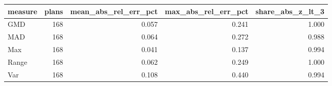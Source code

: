 \begin{tabular}{lrrrr}
\toprule
measure & plans & mean_abs_rel_err_pct & max_abs_rel_err_pct & share_abs_z_lt_3 \\
\midrule
GMD & 168 & 0.057 & 0.241 & 1.000 \\
MAD & 168 & 0.064 & 0.272 & 0.988 \\
Max & 168 & 0.041 & 0.137 & 0.994 \\
Range & 168 & 0.062 & 0.249 & 1.000 \\
Var & 168 & 0.108 & 0.440 & 0.994 \\
\bottomrule
\end{tabular}
